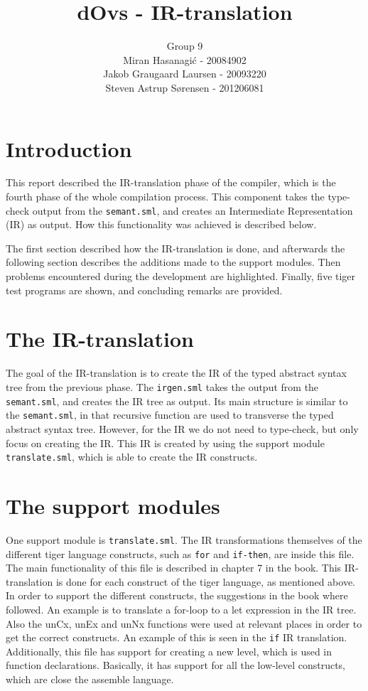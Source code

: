 \documentclass{article}
\title{dOvs - IR-translation}
\author{
  Group 9 \\
  Miran Hasanagi\'{c} - 20084902 \\
  Jakob Graugaard Laursen - 20093220\\
  Steven Astrup S\o rensen - 201206081
}
\begin{document}
\maketitle

\section{Introduction}
This report described the IR-translation phase of the compiler, which is the fourth phase of the whole compilation process. This component takes the type-check output from the \texttt{semant.sml}, and creates an Intermediate Representation (IR) as output. How this functionality was achieved is described below.

The first section described how the IR-translation is done, and afterwards the following section describes the additions made to the support modules. Then problems encountered during the development are highlighted. Finally, five tiger test programs are shown, and concluding remarks are provided.

\section{The IR-translation}

The goal of the IR-translation is to create the IR of the typed abstract syntax tree from the previous phase. The \texttt{irgen.sml} takes the output from the \texttt{semant.sml}, and creates the IR tree as output. Its main structure is similar to the \texttt{semant.sml}, in that recursive function are used to transverse the typed abstract syntax tree. However, for the IR we do not need to type-check, but only focus on creating the IR. This IR is created by using the support module \texttt{translate.sml}, which is able to create the IR constructs.

\section{The support modules}

One support module is \texttt{translate.sml}. The IR transformations themselves of the different tiger language constructs, such as \texttt{for} and \texttt{if-then}, are inside this file. 
The main functionality of this file is described in chapter 7 in the book. This IR-translation is done for each construct of the tiger language, as mentioned above. In order to support the different constructs, the suggestions in the book where followed. An example is to translate a for-loop to a let expression in the IR tree. 
Also the unCx, unEx and unNx functions were used at relevant places in order to get the correct constructs. An example of this is seen in the \texttt{if} IR translation. 
Additionally, this file has support for creating a new level, which is used in function declarations. Basically, it has support for all the low-level constructs, which are close the assemble language. 
\end{document}
